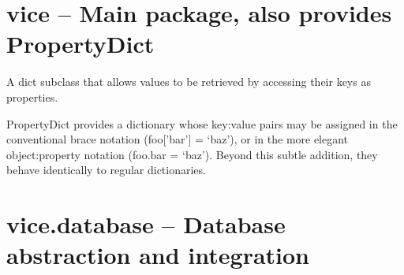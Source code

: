 \documentclass[letterpaper,10pt,english]{sphinxmanual}
\begin{document}
\section{vice -- Main package, also provides PropertyDict}
\label{api_reference:vice-main-package-also-provides-propertydict}\label{api_reference:vice}

\begin{fulllineitems}
\label{api_reference:vice.PropertyDict}
A dict subclass that allows values to be retrieved by accessing their
keys as properties.

PropertyDict provides a dictionary whose key:value pairs may be
assigned in the conventional brace notation (foo{[}'bar'{]} = `baz'),
or in the more elegant object:property notation (foo.bar = `baz').
Beyond this subtle addition, they behave identically to regular
dictionaries.

\end{fulllineitems}



\section{vice.database -- Database abstraction and integration}
\label{api_reference:vice-database-database-abstraction-and-integration}\label{api_reference:module-vice.database}\label{api_reference:vice-database}
\end{document}
